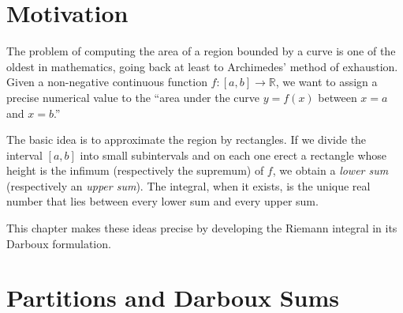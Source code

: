 \documentclass[12pt,a4paper]{book}
\theoremstyle{definition}
\newcommand{\R}{\mathbb{R}}
\begin{document}
\section*{Motivation}

The problem of computing the area of a region bounded by a curve is one
of the oldest in mathematics, going back at least to Archimedes' method
of exhaustion.  Given a non-negative continuous function
$f\colon[a,b]\to\R$, we want to assign a precise numerical value to the
``area under the curve $y=f(x)$ between $x=a$ and $x=b$.''

The basic idea is to approximate the region by rectangles.  If we divide
the interval $[a,b]$ into small subintervals and on each one erect a
rectangle whose height is the infimum (respectively the supremum) of $f$,
we obtain a \emph{lower sum} (respectively an \emph{upper sum}).  The
integral, when it exists, is the unique real number that lies between
every lower sum and every upper sum.

\begin{center}
\end{center}

This chapter makes these ideas precise by developing the Riemann integral
in its Darboux formulation.


\section{Partitions and Darboux Sums}\label{sec:partitions}
\end{document}
